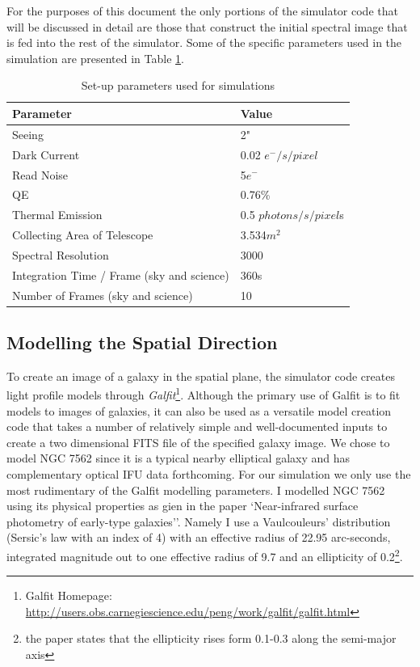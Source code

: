\documentclass[11pt,twoside]{article}
\begin{document}
For the purposes of this document the only portions of the simulator code that will be discussed in detail are those that construct the initial spectral image that is fed into the rest of the simulator. Some of the specific parameters used in the simulation are presented in Table \ref{param}.
\begin{table}
\centering
\caption{Set-up parameters used for simulations}
\label{param}

\begin{tabular}{|l|l|}
\hline
\bf{Parameter}&\bf{Value}\\ \hline
Seeing&2"\\
Dark Current&0.02 $e^-/s/pixel$\\
Read Noise&5$e^-$\\
QE&0.76\%\\
Thermal Emission&0.5 $photons/s/pixel$s\\
Collecting Area of Telescope&3.534$m^2$\\
Spectral Resolution&3000\\
Integration Time / Frame (sky and science)&360s\\
Number of Frames (sky and science) &10\\ \hline
\end{tabular}
\end{table}




\subsection{Modelling the Spatial Direction}
To create an image of a galaxy in the spatial plane, the simulator code creates light profile models through \emph{Galfit}\footnote{Galfit Homepage: \url{http://users.obs.carnegiescience.edu/peng/work/galfit/galfit.html} }. Although the primary use of Galfit is to fit models to images of galaxies, it can also be used as a versatile model creation code that takes a number of relatively simple and well-documented inputs to create a two dimensional FITS file of the specified galaxy image. We chose to model NGC 7562 since it is a typical nearby elliptical galaxy and has complementary optical IFU data forthcoming. For our simulation we only use the most rudimentary of the Galfit modelling parameters. I modelled NGC 7562 using its physical properties as gien in the paper `Near-infrared surface photometry of early-type galaxies''\cite{Rembold}. Namely I use a Vaulcouleurs' distribution (Sersic's law with an index of 4) with an effective radius of 22.95 arc-seconds, integrated magnitude out to one effective radius of 9.7 and an ellipticity of 0.2\footnote{the paper states that the ellipticity rises form 0.1-0.3 along the semi-major axis}. 
\end{document}
